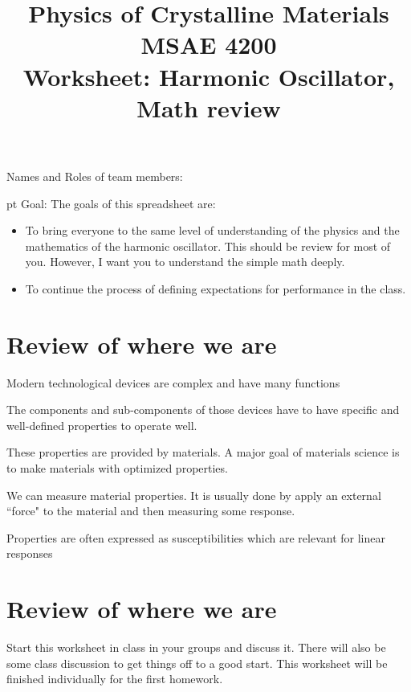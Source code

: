 \documentclass[]{revtex4}
\begin{document}
\title{Physics of Crystalline Materials\\
MSAE 4200\\
Worksheet: Harmonic Oscillator, Math review}

\maketitle

\vskip 24pt
{Names and Roles of team members:}

 pt
Goal: The goals of this spreadsheet are:
\begin{itemize}
\item To bring everyone to the same level of understanding of the physics and the mathematics of the harmonic oscillator.  This should be review for most of you.  However, I want you to understand the simple math deeply.
\item To continue the process of defining expectations for performance in the class.
\end{itemize}

\cork{}
\vskip 12pt



\section*{Review of where we are}
\be
\item Modern technological devices are complex and have many functions
\item The components and sub-components of those devices have to have specific and well-defined properties to operate well.
\item These properties are provided by materials.  A major goal of materials science is to make materials with optimized properties.
\item We can measure material properties. It is usually done by apply an external ``force" to the material and then measuring some response.
\item Properties are often expressed as susceptibilities which are relevant for linear responses
\ee



\section*{Review of where we are}
Start this worksheet in class in your groups and discuss it.  There will also be some class discussion to get things off to a good start.  This worksheet will be finished individually for the first homework.
\end{document}
